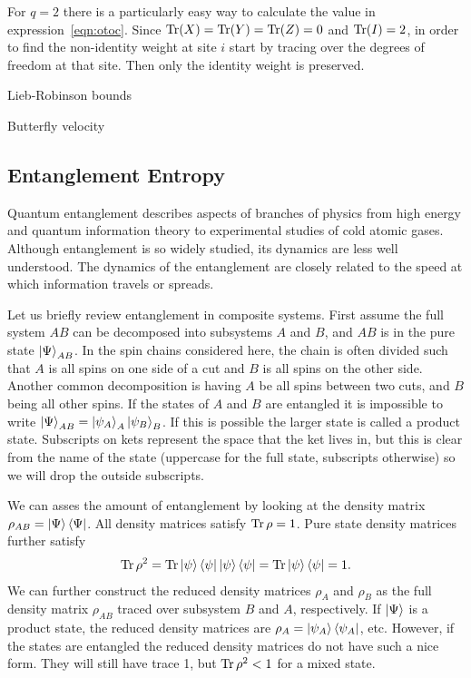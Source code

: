 For $q=2$ there is a particularly easy way to calculate the value in expression~\ref{eqn:otoc}. Since $\operatorname{Tr}(X) = \operatorname{Tr}(Y)=\operatorname{Tr}(Z) = 0$ and $\operatorname{Tr}(I) = 2$, in order to find the non-identity weight at site $i$ start by tracing over the degrees of freedom at that site. Then only the identity weight is preserved. 

Lieb-Robinson bounds

Butterfly velocity

\subsection{Entanglement Entropy} \label{sub:intro}

Quantum entanglement describes aspects of branches of physics from high energy and quantum information theory to experimental studies of cold atomic gases. Although entanglement is so widely studied, its dynamics are less well understood. The dynamics of the entanglement are closely related to the speed at which information travels or spreads. 

Let us briefly review entanglement in composite systems. First assume the full system $AB$ can be decomposed into subsystems $A$ and $B$, and $AB$ is in the pure state $\left|\Psi\right\rangle_{{AB}}$. In the spin chains considered here, the chain is often divided such that $A$ is all spins on one side of a cut and $B$ is all spins on the other side. Another common decomposition is having $A$ be all spins between two cuts, and $B$ being all other spins. If the states of $A$ and $B$ are entangled it is impossible to write $\left|\Psi\right\rangle_{AB} = \left|\psi_A\right\rangle_A \left|\psi_B\right\rangle_B$. If this is possible the larger state is called a product state. Subscripts on kets represent the space that the ket lives in, but this is clear from the name of the state (uppercase for the full state, subscripts otherwise) so we will drop the outside subscripts.

We can asses the amount of entanglement by looking at the density matrix $\rho_{AB} = \left|\Psi\right\rangle\left\langle\Psi\right|$. All density matrices satisfy $\operatorname{Tr} \rho = 1$. Pure state density matrices further satisfy 
\begin{align}
\operatorname{Tr} \rho^2 = \operatorname{Tr}\left|\psi\right\rangle\left\langle\psi\right|\left|\psi\right\rangle\left\langle\psi\right| = \operatorname{Tr}\left|\psi\right\rangle\left\langle\psi\right| = 1.
\end{align}
We can further construct the reduced density matrices $\rho_A$ and $\rho_B$ as the full density matrix $\rho_{AB}$ traced over subsystem $B$ and $A$, respectively. If $\left|\Psi\right\rangle$ is a product state, the reduced density matrices are $\rho_A = \left|\psi_A\right\rangle\left\langle\psi_A\right|$, etc. However, if the states are entangled the reduced density matrices do not have such a nice form. They will still have trace 1, but $\operatorname{Tr}\rho^2<1$ for a mixed state.

